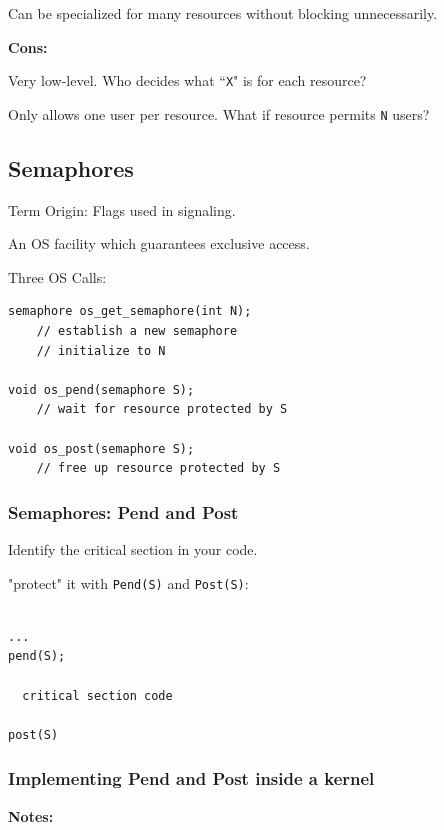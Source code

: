  Can be specialized for many resources without
 blocking unnecessarily.

{\bf Cons:}

  Very low-level.   Who decides what ``{\tt X}" is
  for each resource?

  Only allows one user per resource. What if resource
  permits {\tt N} users?


\subsection{Semaphores}

Term Origin: Flags used in signaling.

An OS facility which guarantees exclusive access.

Three OS Calls:

\begin{verbatim}
semaphore os_get_semaphore(int N);
    // establish a new semaphore
    // initialize to N

void os_pend(semaphore S);
    // wait for resource protected by S

void os_post(semaphore S);
    // free up resource protected by S

\end{verbatim}


\subsubsection{Semaphores: Pend and Post}

Identify the critical section in your code.

"protect" it with {\tt Pend(S)} and {\tt Post(S)}:
\begin{verbatim}

...
pend(S);

  critical section code

post(S)
\end{verbatim}



\subsubsection{Implementing Pend and Post inside a kernel}
{\bf Notes:   }

